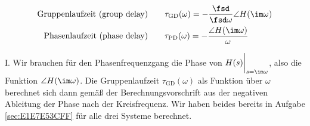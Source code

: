 \begin{Werkzeug}
\begin{align}
\text{Gruppenlaufzeit (group delay)}
\qquad&\tau_\mathrm{GD}(\omega) = -\frac{\fsd}{\fsd \omega} \angle H(\im\omega)\\
\text{Phasenlaufzeit (phase delay)}
\qquad&\tau_\mathrm{PD}(\omega) = -\frac{\angle H(\im\omega)}{\omega}
\end{align}
\end{Werkzeug}
\begin{Ansatz}
I. Wir brauchen für den Phasenfrequenzgang die
Phase von $H(s)\bigg|_{s=\im\omega}$, also die Funktion $\angle H(\im\omega)$.
Die Gruppenlaufzeit $\tau_\mathrm{GD}(\omega)$ als Funktion über $\omega$
berechnet sich dann gemäß der Berechnungsvorschrift aus der negativen Ableitung
der Phase nach der Kreisfrequenz.
Wir haben beides bereits in Aufgabe \ref{sec:E1E7E53CFF} für alle drei
Systeme berechnet.
\end{Ansatz}
